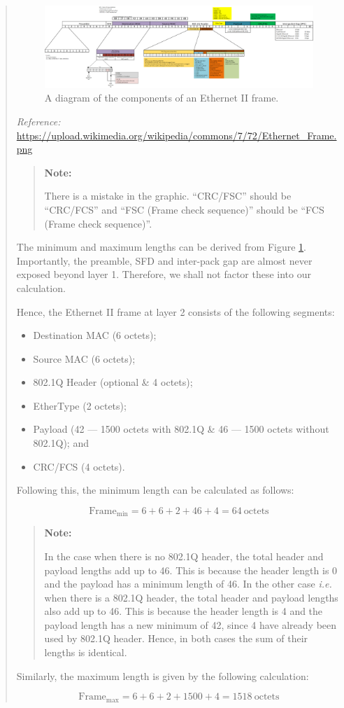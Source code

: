\documentclass{article}
\newenvironment{ans}
{\fbox{Answer}\begin{quote}\nopagebreak}
{\end{quote}}
\newcommand\Refer[1]{
\begin{center}
{\small\textit{Reference:} \url{#1}}
\end{center}
}%
\newcommand\ie{\emph{i.e.}}
\newenvironment{note}{%
\begin{quote}
\begin{tcolorbox}[colback=gray!10,arc=0mm,boxrule=0pt]
\raggedright
\textbf{Note:}%
}{%
\end{tcolorbox}
\end{quote}%
}
\begin{document}
\begin{ans}
\begin{figure}[H]
\centering
\includegraphics[width=16cm]{data/q4.2-ethernet-diagram.png}
\caption{A diagram of the components of an Ethernet II frame.}
\label{fig:eth2-frame}
\end{figure}

\Refer{https://upload.wikimedia.org/wikipedia/commons/7/72/Ethernet_Frame.png}

\begin{note}
There is a mistake in the graphic. ``CRC/FSC'' should be
``CRC/FCS'' and ``FSC (Frame check sequence)'' should be ``FCS
(Frame check sequence)''.
\end{note}

The minimum and maximum lengths can be derived from Figure
\ref{fig:eth2-frame}. Importantly, the preamble, SFD and
inter-pack gap are almost never exposed beyond layer 1.
Therefore, we shall not factor these into our calculation.

Hence, the Ethernet II frame at layer 2 consists of the
following segments:

\begin{itemize}
\item Destination MAC (6 octets);
\item Source MAC (6 octets);
\item 802.1Q Header (optional \& 4 octets);
\item EtherType (2 octets);
\item Payload (42 --- 1500 octets with 802.1Q \& 46 --- 1500
      octets without 802.1Q); and
\item CRC/FCS (4 octets).
\end{itemize}

Following this, the minimum length can be calculated as follows:

$$
{\text{Frame}}_{\text{min}} = 6 + 6 + 2 + 46 + 4 = 64\ \text{octets}
$$

\begin{note}
In the case when there is no 802.1Q header, the total header and
payload lengths add up to 46. This is because the header length
is 0 and the payload has a minimum length of 46. In the other
case \ie{} when there is a 802.1Q header, the total header and
payload lengths also add up to 46. This is because the header
length is 4 and the payload length has a new minimum of 42,
since 4 have already been used by 802.1Q header. Hence, in both
cases the sum of their lengths is identical.
\end{note}

Similarly, the maximum length is given by the following
calculation:

$$
{\text{Frame}}_{\text{max}} = 6 + 6 + 2 + 1500 + 4 = 1518\ \text{octets}
$$
\end{ans}
\end{document}

